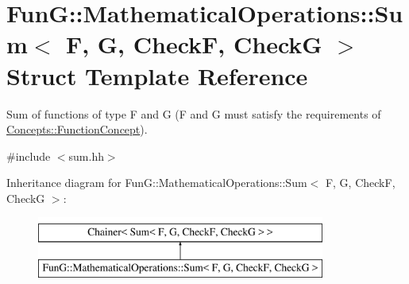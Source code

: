 \hypertarget{structFunG_1_1MathematicalOperations_1_1Sum}{}\section{FunG\+:\+:Mathematical\+Operations\+:\+:Sum$<$ F, G, CheckF, CheckG $>$ Struct Template Reference}
\label{structFunG_1_1MathematicalOperations_1_1Sum}


Sum of functions of type F and G (F and G must satisfy the requirements of \hyperlink{structFunG_1_1Concepts_1_1FunctionConcept}{Concepts\+::\+Function\+Concept}).  




{\ttfamily \#include $<$sum.\+hh$>$}

Inheritance diagram for FunG\+:\+:Mathematical\+Operations\+:\+:Sum$<$ F, G, CheckF, CheckG $>$\+:\begin{figure}[H]
\begin{center}
\leavevmode
\includegraphics[height=2.000000cm]{structFunG_1_1MathematicalOperations_1_1Sum}
\end{center}
\end{figure}

